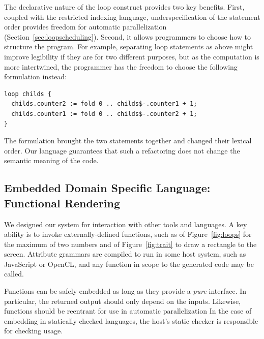 The declarative nature of the loop construct provides two key benefits. First, coupled with the restricted indexing language, underspecification of the statement order provides freedom for automatic parallelization (Section~\ref{sec:loopscheduling}). Second, it allows programmers to choose how to structure the program. For example, separating loop statements as above might improve legibility if they are for two different purposes, but as the computation is more intertwined, the programmer has the freedom to choose the following formulation instead:
\begin{lstlisting}
loop childs {
  childs.counter2 := fold 0 .. childs$-.counter1 + 1;
  childs.counter1 := fold 0 .. childs$-.counter2 + 1;
}
\end{lstlisting}
The formulation brought the two statements together and changed their lexical order. Our language guarantees that such a refactoring does not change the semantic meaning of the code.


\subsection{Embedded Domain Specific Language: Functional Rendering}
We designed our system for interaction with other tools and languages. A key ability is to invoke externally-defined functions, such as   of Figure~\ref{fig:loops} for the maximum of two numbers and  of Figure~\ref{fig:trait} to draw a rectangle to the screen. Attribute grammars are compiled to run in some host system, such as JavaScript or OpenCL, and any function in scope to the generated code may be called.

Functions can be safely embedded as long as they provide a \emph{pure} interface. In particular, the returned output should only depend on the inputs. Likewise, functions should be reentrant for use in automatic parallelization In the case of embedding in statically checked languages, the host's static checker is responsible for checking usage.



